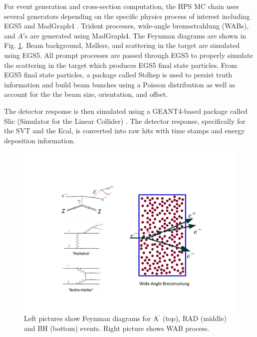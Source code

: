 For event generation and cross-section computation, the HPS MC chain uses several generators depending on the specific physics process of interest including EGS5 \cite{hirayama2005egs5} and MadGraph4 \cite{Alwall_2007}. Trident processes, wide-angle bremsstrahlung (WABs), and $A'$s are generated using MadGraph4. The Feynman diagrams are shown in Fig. \ref{fig:feynman-diagram}. Beam background, M\o llers, and scattering in the target are simulated using EGS5. All prompt processes are passed through EGS5 to properly simulate the scattering in the target which produces EGS5 final state particles. From EGS5 final state particles, a package called Stdhep is used to persist truth information and build beam bunches using a Poisson distribution as well as account for the the beam size, orientation, and offset. %

The detector response is then simulated using a GEANT4-based package called Slic (Simulator for the Linear Collider) \cite{doi:10.1063/1.2396991}. The detector response, specifically for the SVT and the Ecal, is converted into raw hits with time stamps and energy deposition information.

\begin{figure}[!h]
    \centering
    \includegraphics[width=1.\textwidth]{figs/recon/feynman-diagram.pdf}
    \caption{Left pictures show Feynman diagrams for A$^{'}$ (top), RAD (middle) and BH (bottom) events. Right picture shows WAB process.}
    \label{fig:feynman-diagram}
\end{figure}

